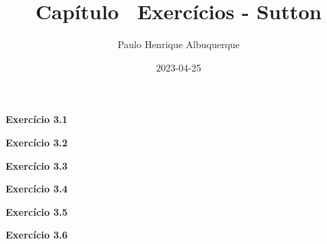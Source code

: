 \documentclass{article}
\title{Capítulo \cha\ Exercícios   - Sutton}
\author{Paulo Henrique Albuquerque}
\date{2023-04-25}
\begin{document}
\maketitle

\textbf{Exercício 3.1}  
\vspace{5mm}

\textbf{Exercício 3.2} 
\vspace{5mm}

\textbf{Exercício 3.3} 
\vspace{5mm}

\textbf{Exercício 3.4} 
\vspace{5mm}

\textbf{Exercício 3.5} 
\vspace{5mm}

\textbf{Exercício 3.6} 
\vspace{5mm}
\end{document}
